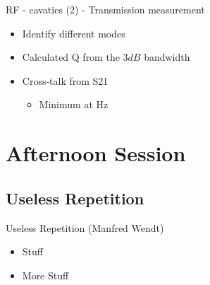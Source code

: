 \documentclass{beamer}
\begin{document}
\begin{frame}[t,fragile]{RF - cavaties (2) - Transmission measurement}
\begin{itemize}
\item Identify different modes 
\item Calculated Q from the $3 dB$ bandwidth
\item Cross-talk from S21
\begin{itemize}
\item Minimum at Hz
\end{itemize}
\end{itemize}
\end{frame}

\section{Afternoon Session}
\subsection{Useless Repetition}
\begin{frame}[t,fragile]{Useless Repetition (Manfred Wendt)}
\begin{itemize}
\item Stuff
\item More Stuff
\end{itemize}
\begin{figure}
  \centering\setcounter{subfigure}{0}
  \quad
  \\
  \quad
\end{figure}
\end{frame}
\end{document}
